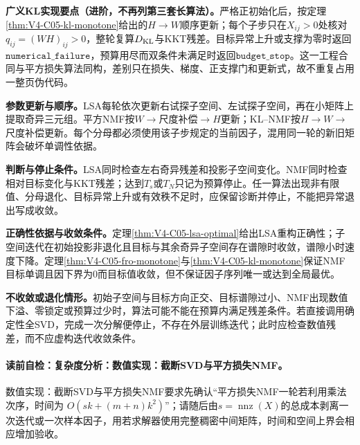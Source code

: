 \FloatBarrier
{}

\begin{comparisonbox}
\textbf{广义KL实现要点（进阶，不再列第三套长算法）。}严格正初始化后，按定理\ref{thm:V4-C05-kl-monotone}给出的$H\to W$顺序更新；每个子步只在$X_{ij}>0$处核对$q_{ij}=(WH)_{ij}>0$，整轮复算$D_{\rm KL}$与KKT残差。目标异常上升或支撑为零时返回$\mathtt{numerical\_failure}$，预算用尽而双条件未满足时返回$\mathtt{budget\_stop}$。这一工程合同与平方损失算法同构，差别只在损失、梯度、正支撑门和更新式，故不重复占用一整页伪代码。
\end{comparisonbox}

\label{struct:V4-C05-CH23}
\textbf{参数更新与顺序。}LSA每轮依次更新右试探子空间、左试探子空间，再在小矩阵上提取奇异三元组。平方NMF按$W\to$尺度补偿$\to H$更新；KL--NMF按$H\to W\to$尺度补偿更新。每个分母都必须使用该子步规定的当前因子，混用同一轮的新旧矩阵会破坏单调性依据。

\label{struct:V4-C05-CH24}
\textbf{判断与停止条件。}LSA同时检查左右奇异残差和投影子空间变化。NMF同时检查相对目标变化与KKT残差；达到$T_s$或$T_N$只记为预算停止。任一算法出现非有限值、分母退化、目标异常上升或有效秩不足时，应保留诊断并停止，不能把异常退出写成收敛。

\label{struct:V4-C05-CH25}
\textbf{正确性依据与收敛条件。}定理\ref{thm:V4-C05-lsa-optimal}给出LSA重构正确性；子空间迭代在初始投影非退化且目标与其余奇异子空间存在谱隙时收敛，谱隙小时速度下降。定理\ref{thm:V4-C05-fro-monotone}与\ref{thm:V4-C05-kl-monotone}保证NMF目标单调且因下界为0而目标值收敛，但不保证因子序列唯一或达到全局最优。

\textbf{不收敛或退化情形。}初始子空间与目标方向正交、目标谱隙过小、NMF出现数值下溢、零锁定或预算过少时，算法可能不能在预算内满足残差条件。若直接调用确定性全SVD，完成一次分解便停止，不存在外层训练迭代；此时应检查数值残差，而不应虚构迭代收敛条件。

\label{struct:V4-C05-CH26}
\label{struct:V4-C05-CH27}
\paragraph{读前自检：复杂度分析：数值实现：截断SVD与平方损失NMF。}数值实现：截断SVD与平方损失NMF要求先确认“平方损失NMF一轮若利用乘法次序，时间为 $O(sk+(m+n)k^2)$”；请随后由$s=\operatorname{nnz}(X)$的总成本剥离一次迭代或一次样本因子，用若求解器使用完整稠密中间矩阵，时间和空间上界会相应增加验收。\par

